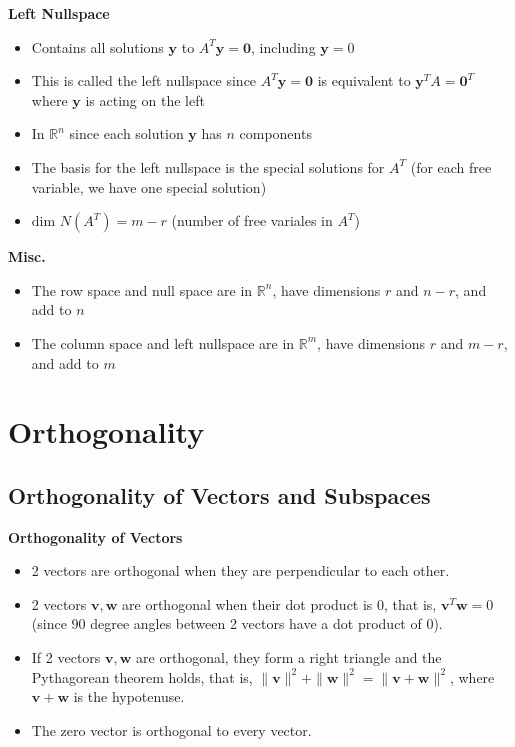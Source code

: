 \documentclass[11pt]{article}
\begin{document}
\textbf{Left Nullspace}
\begin{itemize}
    \item Contains all solutions $\boldsymbol{y}$ to $A^T\boldsymbol{y} = \boldsymbol{0}$, 
    including $\boldsymbol{y} = 0$
    \item This is called the left nullspace since $A^T\boldsymbol{y} = \boldsymbol{0}$ is 
    equivalent to  $\boldsymbol{y}^T A= \boldsymbol{0}^T$ where $\boldsymbol{y}$ is acting on
    the left
    \item In $\mathbb{R}^n$ since each solution $\boldsymbol{y}$ has $n$ components
    \item The basis for the left nullspace is the special solutions for $A^T$ (for each free 
    variable, we have one special solution)
    \item $\text{dim }N(A^T)=m-r$ (number of free variales in $A^T$)
\end{itemize}

\textbf{Misc.}
\begin{itemize}
    \item The row space and null space are in $\mathbb{R}^n$, have dimensions $r$ and $n-r$, 
    and add to $n$
    \item The column space and left nullspace are in $\mathbb{R}^m$, have dimensions $r$ and 
    $m-r$, and add to $m$
\end{itemize}

\section{Orthogonality}
\subsection{Orthogonality of Vectors and Subspaces}

\textbf{Orthogonality of Vectors}
\begin{itemize}
    \item 2 vectors are orthogonal when they are perpendicular to each other.
    \item 2 vectors $\boldsymbol{v}, \boldsymbol{w}$ are orthogonal when their dot product is 0,
    that is, $\boldsymbol{v}^T\boldsymbol{w}=0$ (since 90 degree angles between 2 vectors have
    a dot product of 0).
    \item If 2 vectors $\boldsymbol{v}, \boldsymbol{w}$ are orthogonal, they form a right 
    triangle and the Pythagorean theorem holds, that is, $\|\boldsymbol{v}\|^2 + 
    \|\boldsymbol{w}\|^2 = \|\boldsymbol{v} + \boldsymbol{w}\|^2$, where $\boldsymbol{v} + 
    \boldsymbol{w}$ is the hypotenuse.
    \item The zero vector is orthogonal to every vector. 
    
\end{itemize}
\end{document}
